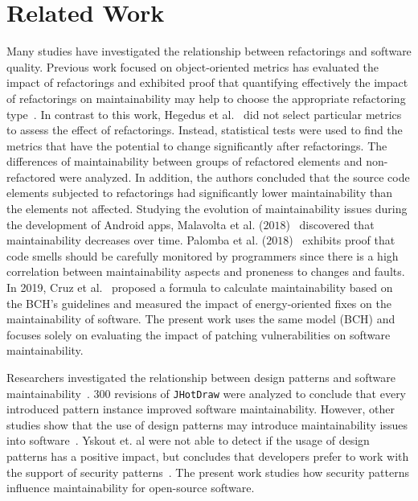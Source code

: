 \documentclass[10pt,conference]{IEEEtran}
\begin{document}
\section{Related Work}\label{sec:rw}

Many studies have investigated the relationship between refactorings and
software quality. Previous work focused on object-oriented metrics has evaluated the
impact of refactorings and exhibited proof that quantifying effectively the
impact of refactorings on maintainability may help to choose the appropriate
refactoring type~\cite{1167822}. In contrast to this work, Hegedus et
al.~\cite{HEGEDUS2018313} did not select particular metrics to assess the effect
of refactorings. Instead, statistical tests were used to find the metrics that
have the potential to change significantly after refactorings. The differences
of maintainability between groups of refactored elements and non-refactored were
analyzed. In addition, the authors concluded that the source code elements
subjected to refactorings had significantly lower maintainability than the
elements not affected. Studying the evolution of maintainability issues during
the development of Android apps, Malavolta et al. ($2018$)~\cite{8530041}
discovered that maintainability decreases over time. Palomba et al.
($2018$)~\cite{Palomba:2018:DIM:3231288.3231337} exhibits proof that code smells
should be carefully monitored by programmers since there is a high correlation
between maintainability aspects and proneness to changes and faults. In 2019, Cruz et 
al.~\cite{cruz2019energyoriented} proposed a formula to calculate maintainability 
based on the BCH's guidelines and measured the impact of energy-oriented fixes 
on the maintainability of software.
The present work uses the same model (BCH) and focuses solely on evaluating 
the impact of patching vulnerabilities on software maintainability.

Researchers investigated the relationship between design patterns and software
maintainability~\cite{10.1007/978-3-642-35267-6-18}. $300$ revisions of
\texttt{JHotDraw} were analyzed to conclude that every introduced pattern
instance improved software maintainability. However, other studies show that the
use of design patterns may introduce maintainability issues into
software~\cite{4493325}. Yskout et. al were not able to detect if the usage of 
design patterns has a positive impact, but concludes that developers prefer to 
work with the support of security patterns~\cite{8077802}. The present work 
studies how security patterns influence maintainability for open-source software.
\end{document}
